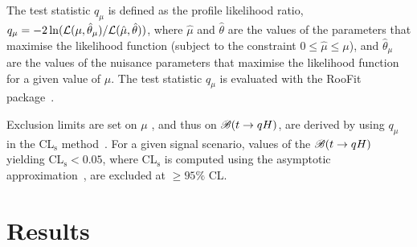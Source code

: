 \documentclass[PAPER, coverpage, atlasdraft=true, texlive=2016, UKenglish]{\ATLASLATEXPATH atlasdoc} %
\begin{document}
The test statistic $q_\mu$ is defined as the profile likelihood ratio, 
$q_\mu = -2\ln({\cal L}(\mu,{\hat{\theta}}_\mu)/{\cal L}(\hat{\mu},\hat{\theta}))$,
where $\hat{\mu}$ and $\hat{\theta}$ are the values of the parameters that
maximise the likelihood function (subject to the constraint $0\leq \hat{\mu} \leq \mu$), and ${\hat{\theta}}_\mu$ are the values of the
nuisance parameters that maximise the likelihood function for a given value of $\mu$. 
The test statistic $q_\mu$ is evaluated with the {\textsc RooFit} package~\cite{Verkerke:2003ir,RooFitManual}.

Exclusion limits are set on $\mu$ , and thus on
$\mathscr{B}(t\to qH)$, are derived by using $q_\mu$ in the CL$_{\textrm{s}}$ method~\cite{Junk:1999kv,Read:2002hq}.
For a given signal scenario, values of the $\mathscr{B}(t\to qH)$ yielding CL$_{\textrm{s}} < 0.05$,
where CL$_{\textrm{s}}$ is computed using the asymptotic approximation~\cite{Cowan:2010js}, are excluded at $\geq 95\%$ CL.


\section{Results}
\label{sec:result}
\end{document}
